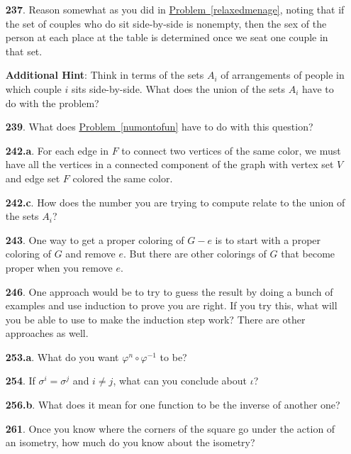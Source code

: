 \documentclass[10pt,]{book}
\theoremstyle{plain}
\theoremstyle{definition}
\theoremstyle{definition}
\numberwithin{equation}{chapter}
\begin{document}
\begin{itemize}[itemsep=1em]
\item[\textbf{237}.]Reason somewhat as you did in \hyperref[relaxedmenage]{Problem~\ref{relaxedmenage}}, noting that if the set of couples who do sit side-by-side is nonempty, then the sex of the person at each place at the table is determined once we seat one couple in that set.%

\par\smallskip
\noindent\textbf{Additional Hint}: Think in terms of the sets \(A_i\) of arrangements of people in which couple \(i\) sits side-by-side. What does the union of the sets \(A_i\) have to do with the problem?%

\item[\textbf{239}.]What does \hyperref[numontofun]{Problem~\ref{numontofun}} have to do with this question?%

\item[\textbf{242.a}.]For each edge in \(F\) to connect two vertices of the same color, we must have all the vertices in a connected component of the graph  with vertex set \(V\) and edge set \(F\) colored the same color.%

\item[\textbf{242.c}.]How does the number you are trying to compute relate to the union of the sets \(A_i\)?%

\item[\textbf{243}.]One way to get a proper coloring of \(G-e\) is to start with a proper coloring of \(G\) and remove \(e\). But there are other colorings of \(G\) that become proper when you remove \(e\).%

\item[\textbf{246}.]One approach would be to try to guess the result by doing a bunch of examples and use induction to prove you are right. If you try this, what will you be able to use to make the induction step work? There are other approaches as well.%

\item[\textbf{253.a}.]What do you want \(\varphi^n\circ\varphi^{-1}\) to be?%

\item[\textbf{254}.]If \(\sigma^i = \sigma^j\) and \(i \ne j\), what can you conclude about \(\iota\)?%

\item[\textbf{256.b}.]What does it mean for one function to be the inverse of another one?%

\item[\textbf{261}.]Once you know where the corners of the square go under the action of an isometry, how much do you know about the isometry?%


\end{itemize}
\end{document}
